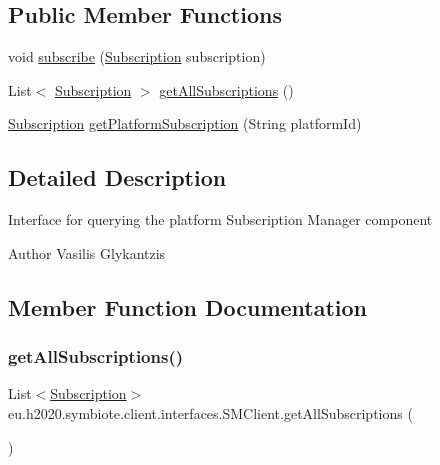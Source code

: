 \subsection*{Public Member Functions}
\begin{DoxyCompactItemize}
\item 
void \hyperlink{interfaceeu_1_1h2020_1_1symbiote_1_1client_1_1interfaces_1_1SMClient_ac9e9feeade418ab9df8e3bbed2f31d0b}{subscribe} (\hyperlink{classeu_1_1h2020_1_1symbiote_1_1cloud_1_1model_1_1internal_1_1Subscription}{Subscription} subscription)
\item 
List$<$ \hyperlink{classeu_1_1h2020_1_1symbiote_1_1cloud_1_1model_1_1internal_1_1Subscription}{Subscription} $>$ \hyperlink{interfaceeu_1_1h2020_1_1symbiote_1_1client_1_1interfaces_1_1SMClient_a02686f9fac26754442f62d37b2027c82}{get\+All\+Subscriptions} ()
\item 
\hyperlink{classeu_1_1h2020_1_1symbiote_1_1cloud_1_1model_1_1internal_1_1Subscription}{Subscription} \hyperlink{interfaceeu_1_1h2020_1_1symbiote_1_1client_1_1interfaces_1_1SMClient_a1b8fae6186f8126666879346e752fc6c}{get\+Platform\+Subscription} (String platform\+Id)
\end{DoxyCompactItemize}


\subsection{Detailed Description}
Interface for querying the platform Subscription Manager component

\begin{DoxyAuthor}{Author}
Vasilis Glykantzis 
\end{DoxyAuthor}


\subsection{Member Function Documentation}
\mbox{\label{interfaceeu_1_1h2020_1_1symbiote_1_1client_1_1interfaces_1_1SMClient_a02686f9fac26754442f62d37b2027c82}} 
\subsubsection{\texorpdfstring{get\+All\+Subscriptions()}{getAllSubscriptions()}}
{\footnotesize\ttfamily List$<$\hyperlink{classeu_1_1h2020_1_1symbiote_1_1cloud_1_1model_1_1internal_1_1Subscription}{Subscription}$>$ eu.\+h2020.\+symbiote.\+client.\+interfaces.\+S\+M\+Client.\+get\+All\+Subscriptions (\begin{DoxyParamCaption}{ }\end{DoxyParamCaption})}

